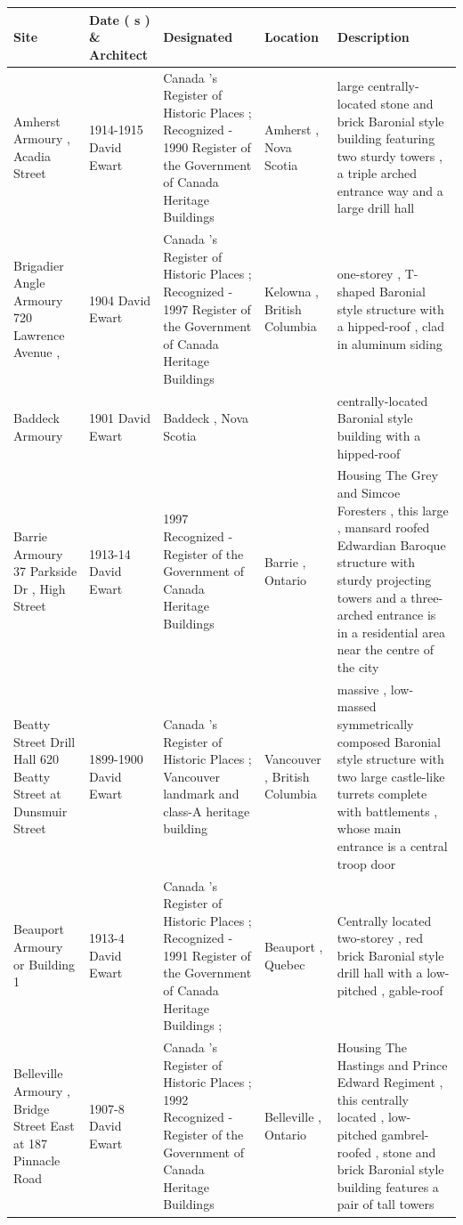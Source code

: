 \documentclass{article}
\begin{document}
\begin{tabular}{lllll}
\toprule
Site & Date ( s ) \& Architect & Designated & Location & Description \\
\midrule
Amherst Armoury , Acadia Street & 1914-1915 David Ewart & Canada 's Register of Historic Places ; Recognized - 1990 Register of the Government of Canada Heritage Buildings & Amherst , Nova Scotia & large centrally-located stone and brick Baronial style building featuring two sturdy towers , a triple arched entrance way and a large drill hall \\
Brigadier Angle Armoury 720 Lawrence Avenue , & 1904 David Ewart & Canada 's Register of Historic Places ; Recognized - 1997 Register of the Government of Canada Heritage Buildings & Kelowna , British Columbia & one-storey , T-shaped Baronial style structure with a hipped-roof , clad in aluminum siding \\
Baddeck Armoury & 1901 David Ewart & Baddeck , Nova Scotia &  & centrally-located Baronial style building with a hipped-roof \\
Barrie Armoury 37 Parkside Dr , High Street & 1913-14 David Ewart & 1997 Recognized - Register of the Government of Canada Heritage Buildings & Barrie , Ontario & Housing The Grey and Simcoe Foresters , this large , mansard roofed Edwardian Baroque structure with sturdy projecting towers and a three-arched entrance is in a residential area near the centre of the city \\
Beatty Street Drill Hall 620 Beatty Street at Dunsmuir Street & 1899-1900 David Ewart & Canada 's Register of Historic Places ; Vancouver landmark and class-A heritage building & Vancouver , British Columbia & massive , low-massed symmetrically composed Baronial style structure with two large castle-like turrets complete with battlements , whose main entrance is a central troop door \\
Beauport Armoury or Building 1 & 1913-4 David Ewart & Canada 's Register of Historic Places ; Recognized - 1991 Register of the Government of Canada Heritage Buildings ; & Beauport , Quebec & Centrally located two-storey , red brick Baronial style drill hall with a low-pitched , gable-roof \\
Belleville Armoury , Bridge Street East at 187 Pinnacle Road & 1907-8 David Ewart & Canada 's Register of Historic Places ; 1992 Recognized - Register of the Government of Canada Heritage Buildings & Belleville , Ontario & Housing The Hastings and Prince Edward Regiment , this centrally located , low-pitched gambrel-roofed , stone and brick Baronial style building features a pair of tall towers \\

\end{tabular}
\end{document}
